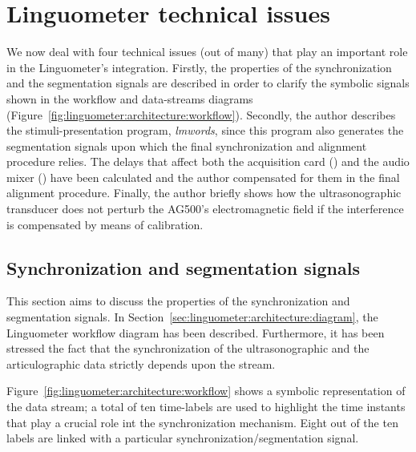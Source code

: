 \section{Linguometer technical issues}
\label{ch:linguometer:technical}
We now deal with four technical issues
(out of many) that play an important role in the Linguometer's integration.
Firstly, the properties of the  synchronization and the segmentation signals 
are described in order to  clarify the symbolic signals
shown in the workflow and data-streams diagrams
(Figure~\ref{fig:linguometer:architecture:workflow}).
Secondly, the author describes the stimuli-presentation program, \emph{lmwords},
since this program also generates the segmentation signals upon which the final
synchronization and alignment procedure relies.
The delays that affect both the acquisition card () and the audio mixer
() have been calculated and the author compensated for them in the final
alignment procedure.
Finally, the author briefly shows how the ultrasonographic transducer does not
perturb the AG500's electromagnetic field if the interference is compensated by
means of calibration.
\subsection{Synchronization and segmentation signals}
\label{sec:linguometer:technical:signals}
This section aims to discuss the properties of the synchronization and
segmentation signals. 
In Section~\ref{sec:linguometer:architecture:diagram},
the Linguometer workflow diagram has been described. 
Furthermore, it has been stressed the fact that the synchronization of the 
ultrasonographic and the articulographic data strictly depends upon the 
 stream.


Figure~\ref{fig:linguometer:architecture:workflow} shows a symbolic
representation of the data  stream; 
a total of ten time-labels are used to highlight the time instants that play a
crucial role int the synchronization mechanism. 
Eight out of the ten labels are linked with a particular
synchronization/segmentation signal.

